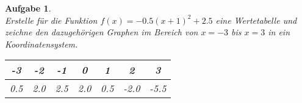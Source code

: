 \documentclass[12pt,fleqn]{article}
\theoremstyle{aufg}
\newtheorem{aufgabe}{Aufgabe}
\theoremstyle{bsp}
\begin{document}
 
    \begin{flushleft}
\begin{center}\end{center}\begin{aufgabe} ~ \\ 
Erstelle f\"ur die Funktion $f(x)=- 0.5 \left(x + 1\right)^{2} + 2.5$ eine Wertetabelle und zeichne den dazugeh\"origen Graphen im Bereich von $x=-3$ bis $x=3$ in ein Koordinatensystem. \\ 
\renewcommand{\arraystretch}{1.0} 
\begin{tabular}{c|c|c|c|c|c|c}
-3 & -2 & -1 & 0 & 1 & 2 & 3\\ \hline 
0.5 & 2.0 & 2.5 & 2.0 & 0.5 & -2.0 & -5.5\\ 

\end{tabular} 


\end{aufgabe}
\end{flushleft}
\end{document}
